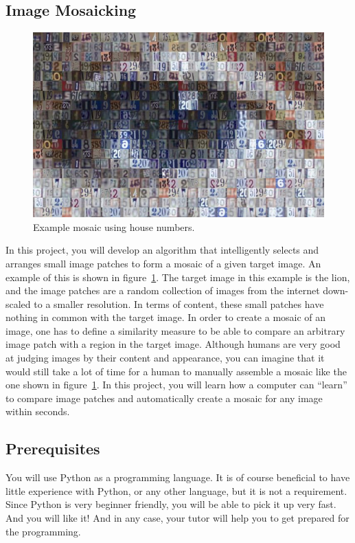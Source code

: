 \documentclass[a4paper]{article}
\begin{document}
	\subsection{Image Mosaicking}
		\begin{figure}
			\centering
			\includegraphics[width=0.7\linewidth]{eye-mosaic}
			\caption{Example mosaic using house numbers.}
			\label{fig:eye-mosaic}
			\label{fig:mosaicking-example}
		\end{figure}
		In this project, you will develop an algorithm that intelligently selects and arranges small image patches to form a mosaic of a given target image.
		An example of this is shown in figure~\ref{fig:mosaicking-example}. 
		The target image in this example is the lion, and the image patches are a random collection of images from the internet down-scaled to a smaller resolution.
		In terms of content, these small patches have nothing in common with the target image.
		In order to create a mosaic of an image, one has to define a similarity measure to be able to compare an arbitrary image patch with a region in the target image. 
		Although humans are very good at judging images by their content and appearance, you can imagine that it would still take a lot of time for a human to manually assemble a mosaic like the one shown in figure~\ref{fig:mosaicking-example}.
		In this project, you will learn how a computer can ``learn'' to compare image patches and automatically create a mosaic for any image within seconds.
	
	\subsection{Prerequisites}
		You will use Python as a programming language. 
		It is of course beneficial to have little experience with Python, or any other language, but it is not a requirement.
		Since Python is very beginner friendly, you will be able to pick it up very fast. 
		And you will like it!
		And in any case, your tutor will help you to get prepared for the programming.
		
\end{document}
